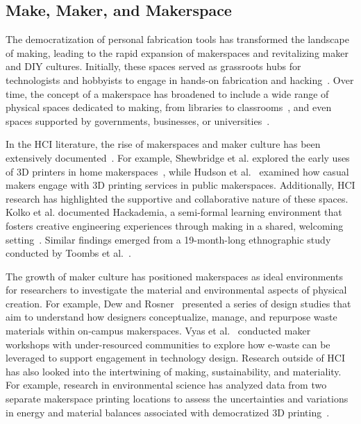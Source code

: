 \subsection{Make, Maker, and Makerspace}

The democratization of personal fabrication tools has transformed the landscape of making, leading to the rapid expansion of makerspaces and revitalizing maker and DIY cultures. 
Initially, these spaces served as grassroots hubs for technologists and hobbyists to engage in hands-on fabrication and hacking~\cite{lindtner2014emerging}.
Over time, the concept of a makerspace has broadened to include a wide range of physical spaces dedicated to making, from libraries to classrooms~\cite{hira2014classroom}, and even spaces supported by governments, businesses, or universities~\cite{freeman2018bottom, matthiesen2015replacing}.

In the HCI literature, the rise of makerspaces and maker culture has been extensively documented~\cite{lindtner2014emerging, bardzell2014now, tanenbaum2013democratizing}. 
For example, Shewbridge et al. explored the early uses of 3D printers in home makerspaces~\cite{shewbridge2014everyday}, while Hudson et al.~\cite{hudson2016understanding} examined how casual makers engage with 3D printing services in public makerspaces. 
Additionally, HCI research has highlighted the supportive and collaborative nature of these spaces. 
Kolko et al. documented Hackademia, a semi-formal learning environment that fosters creative engineering experiences through making in a shared, welcoming setting~\cite{kolko2012hackademia}. 
Similar findings emerged from a 19-month-long ethnographic study conducted by Toombs et al.~\cite{toombs2015proper}.

The growth of maker culture has positioned makerspaces as ideal environments for researchers to investigate the material and environmental aspects of physical creation. 
For example, Dew and Rosner~\cite{10.1145/3322276.3322320} presented a series of design studies that aim to understand how designers conceptualize, manage, and repurpose waste materials within on-campus makerspaces. 
Vyas et al.~\cite{vyas2023democratizing} conducted maker workshops with under-resourced communities to explore how e-waste can be leveraged to support engagement in technology design. 
Research outside of HCI has also looked into the intertwining of making, sustainability, and materiality. 
For example, research in environmental science has analyzed data from two separate makerspace printing locations to assess the uncertainties and variations in energy and material balances associated with democratized 3D printing~\cite{song2019uncertainty}.

